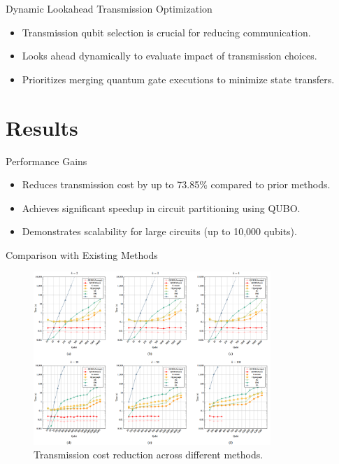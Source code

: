 \documentclass{beamer}
\begin{document}
	\begin{frame}{Dynamic Lookahead Transmission Optimization}
		\begin{itemize}
			\item Transmission qubit selection is crucial for reducing communication.
			\item Looks ahead dynamically to evaluate impact of transmission choices.
			\item Prioritizes merging quantum gate executions to minimize state transfers.
		\end{itemize}
	\end{frame}
	
	\section{Results}
	\begin{frame}{Performance Gains}
		\begin{itemize}
			\item Reduces transmission cost by up to 73.85\% compared to prior methods.
			\item Achieves significant speedup in circuit partitioning using QUBO.
			\item Demonstrates scalability for large circuits (up to 10,000 qubits).
		\end{itemize}
	\end{frame}
	
	\begin{frame}{Comparison with Existing Methods}
		\begin{figure}
			\includegraphics[width=0.8\textwidth]{figure/time.png}  %
			\caption{Transmission cost reduction across different methods.}
		\end{figure}
	\end{frame}
	
\end{document}
